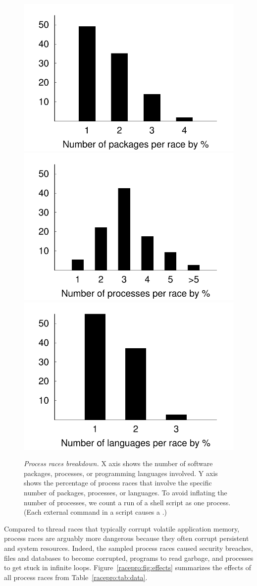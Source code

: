 \begin{figure}[t]
\centering
\includegraphics[width=.45\linewidth]{figures/racepro/race-packages}
\includegraphics[width=.45\linewidth]{figures/racepro/race-processes}
\includegraphics[width=.45\linewidth]{figures/racepro/race-languages}
\caption{{\em Process races breakdown.} X axis shows the number of software
  packages, processes, or programming languages involved.  Y axis shows
  the percentage of process races that involve the specific number of
  packages, processes, or languages.  To avoid inflating the number of
  processes, we count a run of a shell script as one process.  (Each external
  command in a script causes a .)} \label{racepro:fig:breakdown}
\end{figure}

  Compared to thread races that
typically corrupt volatile application memory, process races
are arguably more dangerous because they often corrupt persistent and system resources.
Indeed, the sampled process races caused security breaches, files and databases to
become corrupted, programs to read garbage, and processes to get stuck
in infinite loops. Figure~\ref{racepro:fig:effects} summarizes the effects of
all process races from Table~\ref{racepro:tab:data}.

